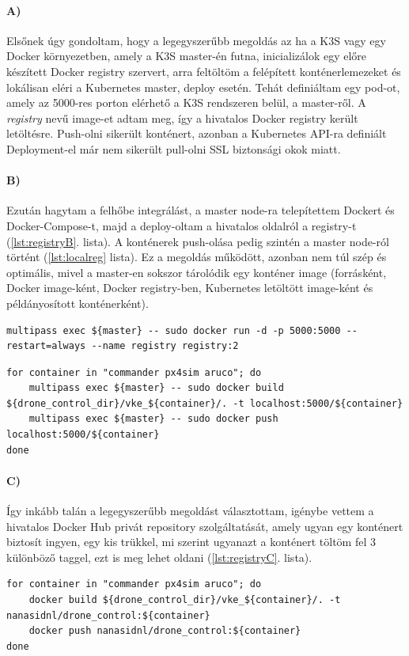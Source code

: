 \noindent
\paragraph{A)}
Elsőnek úgy gondoltam, hogy a legegyszerűbb megoldás az ha a K3S vagy egy Docker környezetben, amely a K3S master-én futna, inicializálok egy előre készített Docker registry szervert, arra feltöltöm a felépített konténerlemezeket és lokálisan eléri a Kubernetes master, deploy esetén. Tehát definiáltam egy pod-ot, amely az 5000-res porton elérhető a K3S rendszeren belül, a master-ről. A \emph{registry} nevű image-et adtam meg, így a hivatalos Docker registry került letöltésre. Push-olni sikerült konténert, azonban a Kubernetes API-ra definiált Deployment-el már nem sikerült pull-olni SSL biztonsági okok miatt. \\

\noindent
\paragraph{B)}
Ezután hagytam a felhőbe integrálást, a master node-ra telepítettem Dockert és Docker-Compose-t, majd a deploy-oltam a hivatalos oldalról a registry-t (\ref{lst:registryB}. lista). A konténerek push-olása pedig szintén a master node-ról történt (\ref{lst:localreg} lista). Ez a megoldás működött, azonban nem túl szép és optimális, mivel a master-en sokszor tárolódik egy konténer image (forrásként, Docker image-ként, Docker registry-ben, Kubernetes letöltött image-ként és példányosított konténerként).
\begin{lstlisting}[caption={Docker registry inicializálás a master docker környezetében},label={lst:registryB}]
multipass exec ${master} -- sudo docker run -d -p 5000:5000 --restart=always --name registry registry:2
\end{lstlisting}
\begin{lstlisting}[caption={Build és push lokál konténer registry-be},label={lst:localreg}]
for container in "commander px4sim aruco"; do
	multipass exec ${master} -- sudo docker build ${drone_control_dir}/vke_${container}/. -t localhost:5000/${container}
	multipass exec ${master} -- sudo docker push localhost:5000/${container}
done
\end{lstlisting}

\paragraph{C)}
Így inkább talán a legegyszerűbb megoldást választottam, igénybe vettem a hivatalos Docker Hub privát repository szolgáltatását, amely ugyan egy konténert biztosít ingyen, egy kis trükkel, mi szerint ugyanazt a konténert töltöm fel 3 különböző taggel, ezt is meg lehet oldani (\ref{lst:registryC}. lista).
\begin{lstlisting}[caption={Docker Hub build és push},label={lst:registryC}]
for container in "commander px4sim aruco"; do
	docker build ${drone_control_dir}/vke_${container}/. -t nanasidnl/drone_control:${container}
	docker push nanasidnl/drone_control:${container}
done
\end{lstlisting}

